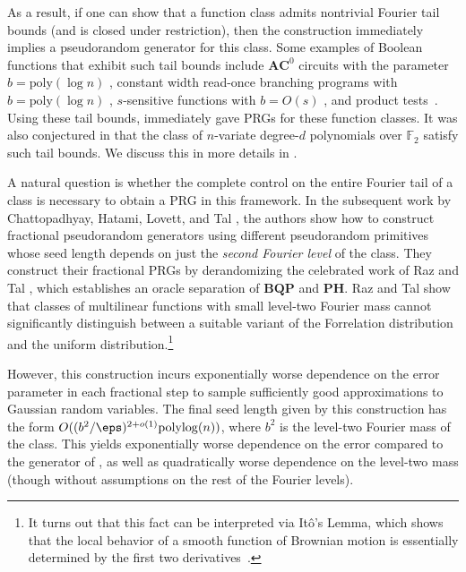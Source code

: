 As a result, if one can show that a function class admits nontrivial Fourier tail bounds (and is closed under restriction), then the \cite{CHHL} construction immediately implies a pseudorandom generator for this class. Some examples of Boolean functions that exhibit such tail bounds include $\mathbf{AC}^0$ circuits with the parameter $b =\mathrm{poly}(\log n)$ \cite{LMN89,tal2017tight}, constant width read-once branching programs with $b =\mathrm{poly}(\log n)$ \cite{chattopadhyay2018improved}, $s$-sensitive functions with $b=O(s)$ \cite{GSW16,GSTW}, and product tests~\cite{DBLP:conf/coco/Lee19}. Using these tail bounds, \cite{CHHL} immediately gave  
PRGs for these function classes. It was also conjectured in \cite{CHHL} that the class of $n$-variate degree-$d$ polynomials over $\mathbb{F}_2$ satisfy such tail bounds.  We discuss this in more details in .

A natural question is whether the complete control on the entire Fourier tail of a class is necessary to obtain a PRG in this framework. In the subsequent work by Chattopadhyay, Hatami, Lovett, and Tal \cite{CHLT}, the authors show how to construct fractional pseudorandom generators using different pseudorandom primitives whose seed length depends on just the \emph{second Fourier level} of the class. They construct their fractional PRGs by derandomizing the celebrated work of Raz and Tal \cite{RazTal}, which establishes an oracle separation of $\mathbf{BQP}$ and $\mathbf{PH}$.  Raz and Tal show that classes of multilinear functions with small level-two Fourier mass cannot significantly distinguish between a suitable variant of the Forrelation distribution and the uniform distribution.\footnote{It turns out that this fact can be interpreted via It\^o's Lemma, which shows that the local behavior of a smooth function of Brownian motion is essentially determined by the first two derivatives~\cite{wu2020stochastic}.}

However, this construction incurs exponentially worse dependence on the error parameter in each fractional step to sample sufficiently good approximations to Gaussian random variables. The final seed length given by this construction has the form $O((b^2/\eps)^{2+o(1)} \mathrm{polylog}(n))$, where $b^2$ is the level-two Fourier mass of the class. This yields exponentially worse dependence on the error compared to the generator of \cite{CHHL}, as well as quadratically worse dependence on the level-two mass (though {without assumptions on the} rest of the Fourier levels).



